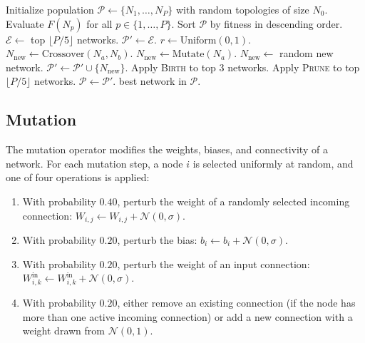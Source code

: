 \begin{algorithm}[h]
  \caption{ModNet Evolution}
  \label{alg:method-evolution}
  \begin{algorithmic}[1]
    \State Initialize population $\mathcal{P} \gets \{N_1, \ldots, N_P\}$
      with random topologies of size $N_0$.
    \State Evaluate $F(N_p)$ for all $p \in \{1, \ldots, P\}$.
      \State Sort $\mathcal{P}$ by fitness in descending order.
      \State $\mathcal{E} \gets$ top $\lfloor P/5 \rfloor$ networks.
      \State $\mathcal{P}' \gets \mathcal{E}$.
        \State $r \gets \text{Uniform}(0, 1)$.
          \State $N_{\text{new}} \gets \text{Crossover}(N_a, N_b)$.
          \State $N_{\text{new}} \gets \text{Mutate}(N_a)$.
        \Else
          \State $N_{\text{new}} \gets$ random new network.
        \EndIf
        \State $\mathcal{P}' \gets \mathcal{P}' \cup \{N_{\text{new}}\}$.
      \EndWhile
        \State Apply \textsc{Birth} to top 3 networks.
      \EndIf
        \State Apply \textsc{Prune} to top $\lfloor P/5 \rfloor$
          networks.
      \EndIf
      \State $\mathcal{P} \gets \mathcal{P}'$.
    \EndFor
    \State \Return best network in $\mathcal{P}$.
  \end{algorithmic}
\end{algorithm}

\subsection{Mutation}
\label{sec:method-mutation}

The mutation operator modifies the weights, biases, and connectivity of
a network. For each mutation step, a node $i$ is selected uniformly at
random, and one of four operations is applied:

\begin{enumerate}
  \item With probability $0.40$, perturb the weight of a randomly
    selected incoming connection:
    $W_{i,j} \gets W_{i,j} + \mathcal{N}(0, \sigma)$.
  \item With probability $0.20$, perturb the bias:
    $b_i \gets b_i + \mathcal{N}(0, \sigma)$.
  \item With probability $0.20$, perturb the weight of an input
    connection:
    $W^{\text{in}}_{i,k} \gets W^{\text{in}}_{i,k} +
    \mathcal{N}(0, \sigma)$.
  \item With probability $0.20$, either remove an existing connection
    (if the node has more than one active incoming connection) or add a
    new connection with a weight drawn from $\mathcal{N}(0, 1)$.
\end{enumerate}

